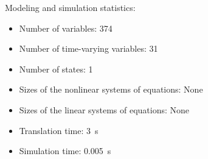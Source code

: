 \begin{contextbox}
  Modeling and simulation statistics:
  \begin{itemize}
    \item Number of variables: 374
    \item Number of time-varying variables: 31
    \item Number of states: 1
    \item Sizes of the nonlinear systems of equations: None
    \item Sizes of the linear systems of equations: None
    \item Translation time: \SI{3}{s}
    \item Simulation time: \SI{0.005}{s}
  \end{itemize}
\end{contextbox}